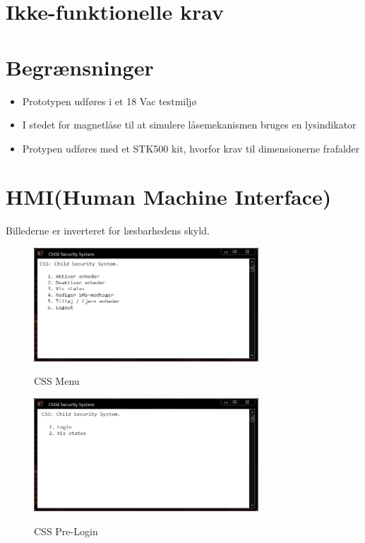 \section{Ikke-funktionelle krav}



\section{Begrænsninger} \label{sectionBegraensninger}
\begin{itemize}
	\item Prototypen udføres i et 18 Vac testmiljø
	\item I stedet for magnetlåse til at simulere låsemekanismen bruges en lysindikator
	\item Protypen udføres med et STK500 kit, hvorfor krav til dimensionerne frafalder
\end{itemize}

\newpage
\section{HMI(Human Machine Interface)}

Billederne er inverteret for læsbarhedens skyld.

\begin{figure}[h] \centering
{\includegraphics[width=0.75\textwidth]{billeder/cmdprompt/CSS_menu}}
\caption{CSS Menu}
\end{figure}

\begin{figure}[h] \centering
{\includegraphics[width=0.75\textwidth]{billeder/cmdprompt/CSS_pre_login_menu}}
\caption{CSS Pre-Login}
\end{figure}

